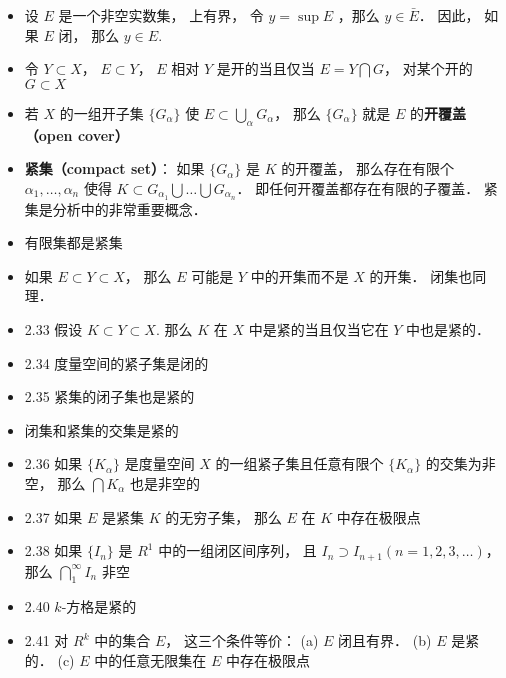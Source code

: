 \begin{itemize}
\item 设 $E$ 是一个非空实数集， 上有界， 令 $y = \sup E$ ，那么 $y \in \bar E$．
因此， 如果 $E$ 闭， 那么 $y \in E$.

\item 令 $Y \subset X$， $E \subset Y$， $E$ 相对 $Y$ 是开的当且仅当 $E = Y \bigcap G$， 对某个开的 $G \subset X$

\item 若 $X$ 的一组开子集 $\{G_\alpha\}$ 使 $E \subset \bigcup_\alpha G_\alpha$， 那么 $\{G_\alpha\}$ 就是 $E$ 的\textbf{开覆盖（open cover）}

\item \textbf{紧集（compact set）}： 如果 $\{G_\alpha\}$ 是 $K$ 的开覆盖， 那么存在有限个 $\alpha_1,\dots, \alpha_n$ 使得 $K \subset G_{\alpha_1} \bigcup \dots \bigcup G_{\alpha_n}$． 即任何开覆盖都存在有限的子覆盖． 紧集是分析中的非常重要概念．

\item 有限集都是紧集

\item 如果 $E \subset Y \subset X$， 那么 $E$ 可能是 $Y$ 中的开集而不是 $X$ 的开集． 闭集也同理．

\item 2.33 假设 $K \subset Y \subset X$. 那么 $K$ 在 $X$ 中是紧的当且仅当它在 $Y$ 中也是紧的．

\item 2.34 度量空间的紧子集是闭的

\item 2.35 紧集的闭子集也是紧的

\item 闭集和紧集的交集是紧的

\item 2.36 如果 $\{K_\alpha\}$ 是度量空间 $X$ 的一组紧子集且任意有限个 $\{K_\alpha\}$ 的交集为非空， 那么 $\bigcap K_\alpha$ 也是非空的

\item 2.37 如果 $E$ 是紧集 $K$ 的无穷子集， 那么 $E$ 在 $K$ 中存在极限点

\item 2.38 如果 $\{I_n\}$ 是 $R^1$ 中的一组闭区间序列， 且 $I_n \supset I_{n+1} (n = 1, 2, 3,\dots)$， 那么 $\bigcap_1^\infty I_n$ 非空

\item 2.40 $k$-方格是紧的

\item 2.41 对 $R^k$ 中的集合 $E$， 这三个条件等价： (a) $E$ 闭且有界． (b) $E$ 是紧的． (c) $E$ 中的任意无限集在 $E$ 中存在极限点


\end{itemize}
